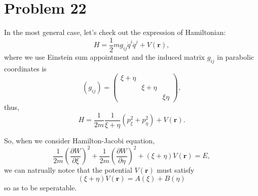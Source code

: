 \section*{Problem 22}   

    In the most general case, let's check out the expression of Hamiltonian:
    \begin{equation*}
        H = \frac{1}{2} m g_{ij} \dot{q}^i \dot{q}^j  +  V\left(\boldsymbol{r}\right),
    \end{equation*}
    where we use Einstein sum appointment and the induced matrix $g_{ij}$ in parabolic coordinates is
    \begin{equation}
        \left(g_{ij}\right)  = \left(
        \begin{matrix}
            \xi + \eta  &               &           \\
                        & \xi + \eta    &           \\
                        &               &  \xi\eta
        \end{matrix}
        \right),
    \end{equation}
    thus,
    \begin{equation}
        H = \frac{1}{2m} \frac{1}{\xi+\eta} \left( p_\xi^2 + p_\eta^2 \right)  +  V\left(\boldsymbol{r}\right).
    \end{equation}

    So, when we consider Hamilton-Jacobi equation,
    \begin{equation}
        \frac{1}{2m} \left(\frac{\partial W}{\partial\xi}\right)^2 + \frac{1}{2m} \left(\frac{\partial W}{\partial\eta}\right)^2  +  \left(\xi+\eta\right)V\left(\boldsymbol{r}\right) = E,
    \end{equation}
    we can natrually notce that the potential $V\left(\boldsymbol{r}\right)$ must satisfy
    \begin{equation}
        \left(\xi+\eta\right)V\left(\boldsymbol{r}\right) = A\left(\xi\right) + B\left(\eta\right)
    \end{equation}
    so as to be seperatable.
